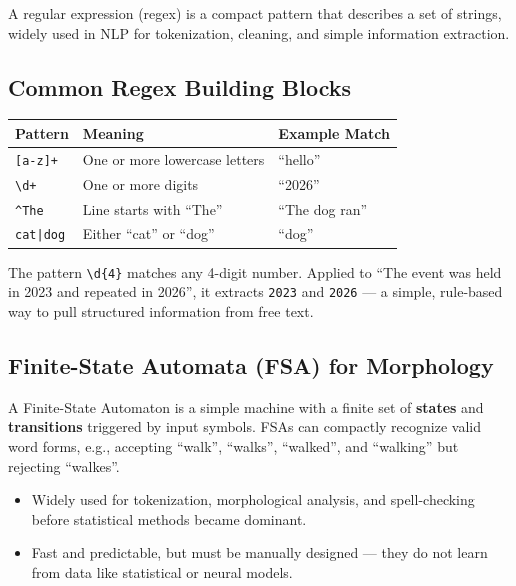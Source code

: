 \documentclass[11pt,a4paper]{article}
\begin{document}
\begin{definitionbox}
A regular expression (regex) is a compact pattern that describes a set of strings, widely used in NLP for tokenization, cleaning, and simple information extraction.
\end{definitionbox}

\subsection{Common Regex Building Blocks}
\begin{center}
\begin{tabular}{@{}p{2.6cm}p{4.6cm}p{5.2cm}@{}}
\toprule
\rowcolor{primary!15}
\textbf{Pattern} & \textbf{Meaning} & \textbf{Example Match} \\
\midrule
\texttt{[a-z]+} & One or more lowercase letters & ``hello'' \\
\texttt{\textbackslash d+} & One or more digits & ``2026'' \\
\texttt{\textasciicircum The} & Line starts with ``The'' & ``The dog ran'' \\
\texttt{cat|dog} & Either ``cat'' or ``dog'' & ``dog'' \\
\bottomrule
\end{tabular}
\end{center}

\begin{examplebox}
The pattern \texttt{\textbackslash d\{4\}} matches any 4-digit number. Applied to ``The event was held in 2023 and repeated in 2026'', it extracts \texttt{2023} and \texttt{2026} --- a simple, rule-based way to pull structured information from free text.
\end{examplebox}

\subsection{Finite-State Automata (FSA) for Morphology}
\begin{conceptbox}[FSA]
A Finite-State Automaton is a simple machine with a finite set of \textbf{states} and \textbf{transitions} triggered by input symbols. FSAs can compactly recognize valid word forms, e.g., accepting ``walk'', ``walks'', ``walked'', and ``walking'' but rejecting ``walkes''.
\end{conceptbox}
\begin{itemize}[leftmargin=*]
  \item Widely used for tokenization, morphological analysis, and spell-checking before statistical methods became dominant.
  \item Fast and predictable, but must be manually designed --- they do not learn from data like statistical or neural models.
\end{itemize}
\end{document}
